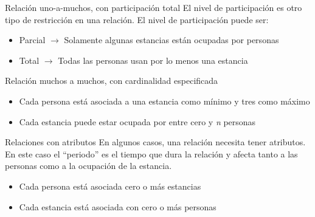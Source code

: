 \documentclass{classes/beamer_GeomaticaUA}
\begin{document}
\begin{frame}{Relación uno-a-muchos, con participación total}
El nivel de participación es otro tipo de restricción en una relación. El nivel de participación puede ser:
\begin{itemize}
\item Parcial $\rightarrow$ Solamente algunas estancias están ocupadas por personas 
\item Total $\rightarrow$ Todas las personas usan por lo menos una estancia
\end{itemize}


\begin{center}

\end{center}

\end{frame}

\begin{frame}{Relación muchos a muchos, con cardinalidad especificada}

\begin{center}

\end{center}

\begin{itemize}
\item Cada persona está asociada a una estancia como mínimo y tres como máximo
\item Cada estancia puede estar ocupada por entre cero y \textit{n} personas
\end{itemize}

\end{frame}

\begin{frame}{Relaciones con atributos}
En algunos casos, una relación necesita tener atributos. En este caso el ``periodo'' es el tiempo que dura la relación y afecta tanto a las personas como a la ocupación de la estancia.

\begin{center}
\resizebox{!}{0.25\textwidth}{}
\end{center}

\begin{itemize}
\item Cada persona está asociada cero o más estancias
\item Cada estancia está asociada con cero o más personas
\end{itemize}

\end{frame}
\end{document}
